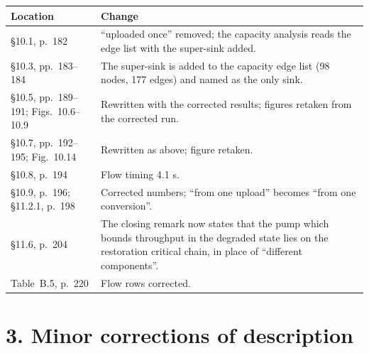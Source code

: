 \documentclass[11pt]{article}
\begin{document}
\begin{tabularx}{\linewidth}{@{}P{3.6cm}L@{}}
\toprule
Location & Change \\
\midrule
\S10.1, p.~182 & ``uploaded once'' removed; the capacity analysis reads the edge list with the
super-sink added. \\
\S10.3, pp.~183--184 & The super-sink is added to the capacity edge list (98 nodes, 177 edges)
and named as the only sink. \\
\S10.5, pp.~189--191; Figs.~10.6--10.9 & Rewritten with the corrected results; figures
retaken from the corrected run. \\
\S10.7, pp.~192--195; Fig.~10.14 & Rewritten as above; figure retaken. \\
\S10.8, p.~194 & Flow timing 4.1 s. \\
\S10.9, p.~196; \S11.2.1, p.~198 & Corrected numbers; ``from one upload'' becomes ``from one
conversion''. \\
\S11.6, p.~204 & The closing remark now states that the pump which bounds throughput in the
degraded state lies on the restoration critical chain, in place of ``different
components''. \\
Table~B.5, p.~220 & Flow rows corrected. \\
\bottomrule
\end{tabularx}

\section*{3. Minor corrections of description}
\end{document}
